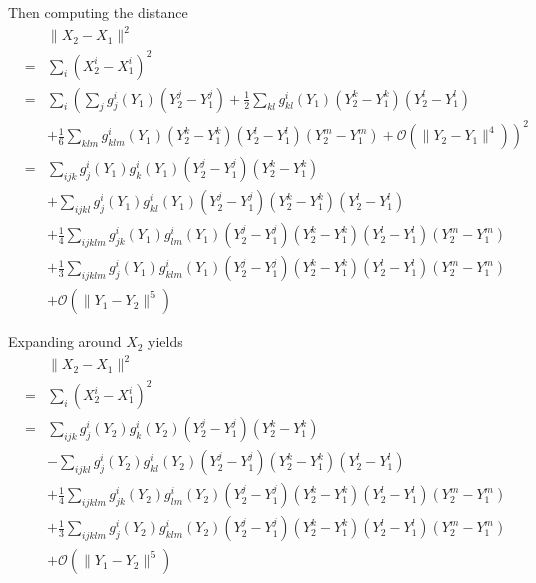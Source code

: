 \documentclass[12pt]{article}
\begin{document}
Then computing the distance
\begin{eqnarray}
&&\| X_2 - X_1 \|^2 \\
&=&  \sum_i (X_2^i - X_1^i)^2 \\
&=& \sum_i  \left( \sum_j g_j^i (Y_1) (Y^j_2 - Y^j_1 )  \right.
+ \frac{1}{2} \sum_{kl}  g^i_{kl} (Y_1) (Y^k_2 - Y^k_1)(Y^l_2 - Y^l_1) \\
&&+ \left.  \frac{1}{6} \sum_{klm}  g^i_{klm} (Y_1) (Y^k_2 - Y^k_1)(Y^l_2 - Y^l_1) (Y^m_2 - Y^m_1) 
 + \mathcal{O}( \|Y_2 - Y_1\|^4 ) \right)^2 \\
&=& \sum_{ijk} g_j^i (Y_1) g_k^i (Y_1) (Y^j_2 - Y^j_1 ) (Y^k_2 - Y^k_1 ) \\
&& + \sum_{ijkl} g_j^i (Y_1) g^i_{kl} (Y_1) (Y^j_2 - Y^j_1 )  (Y^k_2 - Y^k_1)(Y^l_2 - Y^l_1) \\
&& + \frac{1}{4} \sum_{ijklm}  g^i_{jk} (Y_1) g^i_{lm} (Y_1) (Y^j_2 - Y^j_1) (Y^k_2 - Y^k_1) (Y^l_2 - Y^l_1) (Y^m_2 - Y^m_1) \\
&& + \frac{1}{3} \sum_{ijklm}  g^i_{j} (Y_1) g^i_{klm} (Y_1) (Y^j_2 - Y^j_1) (Y^k_2 - Y^k_1) (Y^l_2 - Y^l_1) (Y^m_2 - Y^m_1) \\
&& + \mathcal{O} (\|Y_1 - Y_2 \|^5 )
\end{eqnarray}

Expanding around $X_2$ yields
\begin{eqnarray}
&&\| X_2 - X_1 \|^2 \\
&=&  \sum_i (X_2^i - X_1^i)^2 \\
&=& \sum_{ijk} g_j^i (Y_2) g_k^i (Y_2) (Y^j_2 - Y^j_1 ) (Y^k_2 - Y^k_1 ) \\
&& - \sum_{ijkl} g_j^i (Y_2) g^i_{kl} (Y_2) (Y^j_2 - Y^j_1 )  (Y^k_2 - Y^k_1)(Y^l_2 - Y^l_1) \\
&& + \frac{1}{4} \sum_{ijklm}  g^i_{jk} (Y_2) g^i_{lm} (Y_2) (Y^j_2 - Y^j_1) (Y^k_2 - Y^k_1) (Y^l_2 - Y^l_1) (Y^m_2 - Y^m_1) \\
&& + \frac{1}{3} \sum_{ijklm}  g^i_{j} (Y_2) g^i_{klm} (Y_2) (Y^j_2 - Y^j_1) (Y^k_2 - Y^k_1) (Y^l_2 - Y^l_1) (Y^m_2 - Y^m_1) \\
&& + \mathcal{O} (\|Y_1 - Y_2 \|^5 )
\end{eqnarray}
\end{document}
